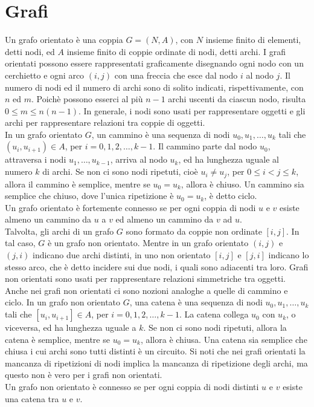 \documentclass[12pt]{report}
\begin{document}
   	\chapter{Grafi}
   	Un grafo orientato è una coppia $G = (N, A)$, con $N$ insieme finito di elementi, detti nodi, ed $A$ insieme finito di coppie ordinate di nodi, detti archi. I grafi orientati possono essere rappresentati graficamente disegnando ogni nodo con un cerchietto e ogni arco $(i, j)$ con una freccia che esce dal nodo $i$ al nodo $j$. Il numero di nodi ed il numero di archi sono di solito indicati, rispettivamente, con $n$ ed $m$. Poichè possono esserci al più $n-1$ archi uscenti da ciascun nodo, risulta $0 \leq m \leq n(n-1)$.
   	In generale, i nodi sono usati per rappresentare oggetti e gli archi per rappresentare relazioni tra coppie di oggetti. \\
   	In un grafo orientato $G$, un cammino è una sequenza di nodi $u_0, u_1, \dots, u_k$ tali che $(u_i, u_{i + 1}) \in A$, per $i = 0, 1, 2, \dots, k - 1$. Il cammino parte dal nodo $u_0$, attraversa i nodi $u_1, \dots, u_{k-1}$, arriva al nodo $u_k$, ed ha lunghezza uguale al numero $k$ di archi. Se non ci sono nodi ripetuti, cioè $u_i \neq u_j$, per $0 \leq i < j \leq k$, allora il cammino è semplice, mentre se $u_0 = u_k$, allora è chiuso. Un cammino sia semplice che chiuso, dove l'unica ripetizione è $u_0 = u_k$, è detto ciclo. \\
   	Un grafo orientato è fortemente connesso se per ogni coppia di nodi $u$ e $v$ esiste almeno un cammino da $u$ a $v$ ed almeno un cammino da $v$ ad $u$. \\
   	Talvolta, gli archi di un grafo $G$ sono formato da coppie non ordinate $[i, j]$. In tal caso, $G$ è un grafo non orientato. Mentre in un grafo orientato $(i, j)$ e $(j, i)$ indicano due archi distinti, in uno non orientato $[i, j]$ e $[j, i]$ indicano lo stesso arco, che è detto incidere sui due nodi, i quali sono adiacenti tra loro. Grafi non orientati sono usati per rappresentare relazioni simmetriche tra oggetti. \\
   	Anche nei grafi non orientati ci sono nozioni analoghe a quelle di cammino e ciclo. In un grafo non orientato $G$, una catena è una sequenza di nodi $u_0, u_1, \dots, u_k$ tali che $[u_i, u_{i+1}] \in A$, per $i = 0, 1, 2, \dots, k - 1$. La catena collega $u_0$ con $u_k$, o viceversa, ed ha lunghezza uguale a $k$. Se non ci sono nodi ripetuti, allora la catena è semplice, mentre se $u_0 = u_k$, allora è chiusa. Una catena sia semplice che chiusa i cui archi sono tutti distinti è un circuito. Si noti che nei grafi orientati la mancanza di ripetizioni di nodi implica la mancanza di ripetizione degli archi, ma questo non è vero per i grafi non orientati. \\
   	Un grafo non orientato è connesso se per ogni coppia di nodi distinti $u$ e $v$ esiste una catena tra $u$ e $v$.
\end{document}
